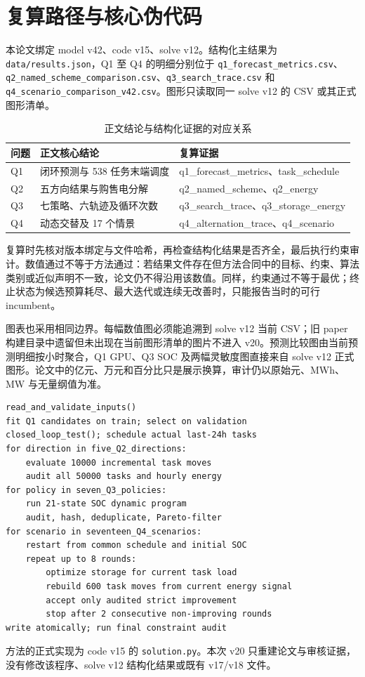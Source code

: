 \appendix
\section{复算路径与核心伪代码}
本论文绑定 model v42、code v15、solve v12。结构化主结果为 \texttt{data/results.json}，Q1 至 Q4 的明细分别位于 \texttt{q1\_forecast\_metrics.csv}、\texttt{q2\_named\_scheme\_comparison.csv}、\texttt{q3\_search\_trace.csv} 和 \texttt{q4\_scenario\_comparison\_v42.csv}。图形只读取同一 solve v12 的 CSV 或其正式图形清单。


\begin{table}[H]\centering
{\small
\caption{正文结论与结构化证据的对应关系}
\begin{tabular}{lll}\toprule
问题 & 正文核心结论 & 复算证据\\\midrule
Q1 & 闭环预测与 538 任务末端调度 & q1\_forecast\_metrics、task\_schedule\\
Q2 & 五方向结果与购售电分解 & q2\_named\_scheme、q2\_energy\\
Q3 & 七策略、六轨迹及循环次数 & q3\_search\_trace、q3\_storage\_energy\\
Q4 & 动态交替及 17 个情景 & q4\_alternation\_trace、q4\_scenario\\\bottomrule
\end{tabular}
}
\end{table}

复算时先核对版本绑定与文件哈希，再检查结构化结果是否齐全，最后执行约束审计。数值通过不等于方法通过：若结果文件存在但方法合同中的目标、约束、算法类别或近似声明不一致，论文仍不得沿用该数值。同样，约束通过不等于最优；终止状态为候选预算耗尽、最大迭代或连续无改善时，只能报告当时的可行 incumbent。

图表也采用相同边界。每幅数值图必须能追溯到 solve v12 当前 CSV；旧 paper 构建目录中遗留但未出现在当前图形清单的图片不进入 v20。预测比较图由当前预测明细按小时聚合，Q1 GPU、Q3 SOC 及两幅灵敏度图直接来自 solve v12 正式图形。论文中的亿元、万元和百分比只是展示换算，审计仍以原始元、MWh、MW 与无量纲值为准。

\begin{verbatim}
read_and_validate_inputs()
fit Q1 candidates on train; select on validation
closed_loop_test(); schedule actual last-24h tasks
for direction in five_Q2_directions:
    evaluate 10000 incremental task moves
    audit all 50000 tasks and hourly energy
for policy in seven_Q3_policies:
    run 21-state SOC dynamic program
    audit, hash, deduplicate, Pareto-filter
for scenario in seventeen_Q4_scenarios:
    restart from common schedule and initial SOC
    repeat up to 8 rounds:
        optimize storage for current task load
        rebuild 600 task moves from current energy signal
        accept only audited strict improvement
        stop after 2 consecutive non-improving rounds
write atomically; run final constraint audit
\end{verbatim}

方法的正式实现为 code v15 的 \texttt{solution.py}。本次 v20 只重建论文与审核证据，没有修改该程序、solve v12 结构化结果或既有 v17/v18 文件。
